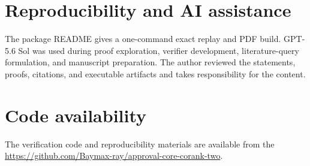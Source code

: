 \documentclass[11pt]{article}
\begin{document}
\section*{Reproducibility and AI assistance}

The package README gives a one-command exact replay and PDF build.  GPT-5.6 Sol
was used during proof exploration, verifier development,
literature-query formulation, and manuscript preparation.  The author
reviewed the statements, proofs, citations, and executable artifacts and
takes responsibility for the content.

\section*{Code availability}

The verification code and reproducibility materials are available from the
\url{https://github.com/Baymax-ray/approval-core-corank-two}.

\small


\end{document}
